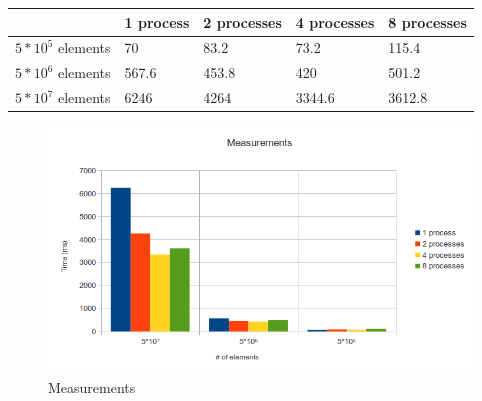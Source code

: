 \documentclass[a4paper,10pt]{article}
\begin{document}
  \begin{center}
\begin{tabular}{|l|l|l|l|l|}
\hline
& 1 process & 2 processes & 4 processes & 8 processes\\
\hline
$5*10^5$ elements & 70& 83.2 & 73.2 & 115.4\\
\hline
$5*10^6$ elements & 567.6 & 453.8 & 420 & 501.2\\
\hline
$5*10^7$ elements & 6246 & 4264 & 3344.6 & 3612.8\\
\hline
  \end{tabular}
  \end{center}
  
  \hspace{1.5cm}
    \begin{figure}[h]
  \begin{center}
  \includegraphics[scale=0.6]{measurements.png}
  \caption{Measurements}
  \end{center}
  \label{measurements}
\end{figure}
\hspace{1.5cm}
\end{document}
